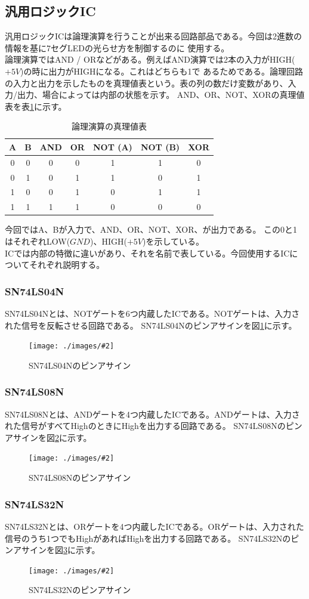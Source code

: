 \documentclass[a4paper,11pt,dvipdfmx]{jsarticle}
\newcommand{\Figure}[4]{
  \begin{figure}[H]
    \centering
    \texttt{[image: ./images/\#2]}
    \caption{#3}
    \label{fig:#4}
  \end{figure}
}
\begin{document}
\subsection{汎用ロジックIC}
汎用ロジックICは論理演算を行うことが出来る回路部品である。今回は2進数の情報を基に7セグLEDの光らせ方を制御するのに
使用する。\\
論理演算ではAND / ORなどがある。例えばAND演算では2本の入力がHIGH($+5V$)の時に出力がHIGHになる。これはどちらも1で
あるためである。論理回路の入力と出力を示したものを真理値表という。表の列の数だけ変数があり、入力/出力、場合によっては内部の状態を示す。
AND、OR、NOT、XORの真理値表を表\ref{tab:logic}に示す。
\begin{table}[H]
  \centering
  \caption{論理演算の真理値表}
  \begin{tabular}{|c|c|c|c|c|c|c|}
    \hline
    A & B & AND & OR & NOT (A) & NOT (B) & XOR \\
    \hline
    0 & 0 & 0 & 0 & 1 & 1 & 0 \\
    0 & 1 & 0 & 1 & 1 & 0 & 1 \\
    1 & 0 & 0 & 1 & 0 & 1 & 1 \\
    1 & 1 & 1 & 1 & 0 & 0 & 0 \\
    \hline
  \end{tabular}
  \label{tab:logic}
\end{table}
今回ではA、Bが入力で、AND、OR、NOT、XOR、が出力である。
この0と1はそれぞれLOW($GND$)、HIGH($+5V$)を示している。\\
ICでは内部の特徴に違いがあり、それを名前で表している。今回使用するICについてそれぞれ説明する。
\subsubsection{SN74LS04N}
SN74LS04Nとは、NOTゲートを6つ内蔵したICである。NOTゲートは、入力された信号を反転させる回路である。
SN74LS04Nのピンアサインを図\ref{fig:NOT}に示す。
\Figure{0.4}{74LS04.png}{SN74LS04Nのピンアサイン}{NOT}

\subsubsection{SN74LS08N}
SN74LS08Nとは、ANDゲートを4つ内蔵したICである。ANDゲートは、入力された信号がすべてHighのときにHighを出力する回路である。
SN74LS08Nのピンアサインを図\ref{fig:AND}に示す。
\Figure{0.4}{74LS08.png}{SN74LS08Nのピンアサイン}{AND}

\subsubsection{SN74LS32N}
SN74LS32Nとは、ORゲートを4つ内蔵したICである。ORゲートは、入力された信号のうち1つでもHighがあればHighを出力する回路である。
SN74LS32Nのピンアサインを図\ref{fig:OR}に示す。
\Figure{0.4}{74LS32.png}{SN74LS32Nのピンアサイン}{OR}
\end{document}

